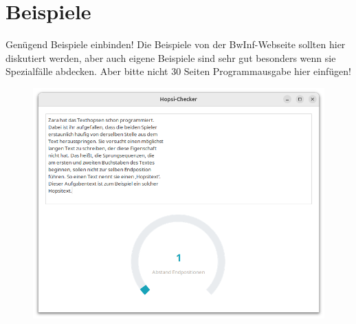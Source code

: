 \documentclass[a4paper,10pt,ngerman]{scrartcl}
\begin{document}
\section{Beispiele}
Genügend Beispiele einbinden! Die Beispiele von der BwInf-Webseite sollten hier diskutiert werden, aber auch eigene Beispiele 
sind sehr gut besonders wenn sie Spezialfälle abdecken. Aber bitte nicht 30 Seiten Programmausgabe hier einfügen!
\begin{figure}[h]
	\centering
	\includegraphics[width=0.7\linewidth]{Beispiel_BWINF_2}
	\caption{}
	\label{fig:beispielbwinf2}
\end{figure}
\end{document}
